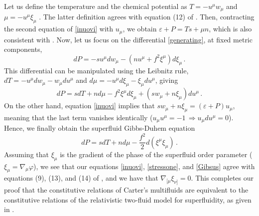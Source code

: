 \documentclass[a4paper, amsfonts, amssymb, amsmath, reprint, showkeys, nofootinbib, twoside, onecolumn, notitlepage]{revtex4-1}
\begin{document}
Let us define the temperature and the chemical potential as $T=-u^\mu w_\mu$ and $\mu =-u^\mu \xi_\mu$ \cite{Termo}. The latter definition agrees with equation (12) of \cite{HoloSup2009}. Then, contracting the second equation of \eqref{inuovi} with $u_\mu$, we obtain $\varepsilon+P=Ts+\mu n$, which is also consistent with \cite{HoloSup2009}. Now, let us focus on the differential \eqref{generating}, at fixed metric components,
\begin{equation}
dP = -s u^\mu dw_\mu -(nu^\mu +f^2 \xi^\mu) d\xi_\mu \, .
\end{equation} 
This differential can be manipulated using the Leibnitz rule, $dT{=}{-}u^\mu dw_\mu{-}w_\mu du^\mu$ and $d\mu{=}{-}u^\mu d\xi_\mu{-}\xi_\mu du^\mu$, giving
\begin{equation}
dP=sdT+nd\mu-f^2 \xi^\mu d\xi_\mu +(sw_\mu +n\xi_\mu) du^\mu \, .
\end{equation}
On the other hand, equation \eqref{inuovi} implies that $sw_\mu +n\xi_\mu=(\varepsilon+P)u_\mu$, meaning that the last term vanishes identically ($u_\mu u^\mu=-1 \, \Rightarrow u_\mu du^\mu=0$). Hence, we finally obtain the superfluid Gibbs-Duhem equation
\begin{equation}\label{Gibsus}
dP = sdT+nd\mu -\dfrac{f^2}{2} d(\xi^\mu \xi_\mu) \, .
\end{equation}
Assuming that $\xi_\mu$ is the gradient of the phase of the superfluid order parameter ($\xi_\mu =\nabla_\mu \varphi$), we see that our equations \eqref{inuovi}, \eqref{stressone}, and \eqref{Gibsus} agree with equations (9), (13), and (14) of \cite{HoloSup2009}, and we have that $\nabla_{[\mu}\xi_{\nu]}=0$. This completes our proof that the constitutive relations of Carter's multifluids are equivalent to the constitutive relations of the relativistic two-fluid model for superfluidity, as given in \cite{Son2001,HoloSup2009,Battacharya2011,Bhattacharya2014,
JensenKovtun2012}.





\label{lastpage}
\end{document}
